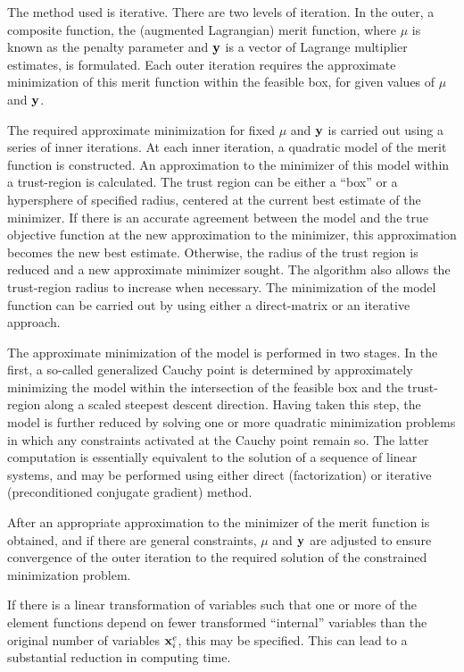 \documentclass{galahad}
\newcommand{\calG}{{\cal G}}
\begin{document}
The method used is iterative. There are two levels of iteration. In
the outer, a composite function, the (augmented Lagrangian) merit function,
\eqn{objectiveb}{\phi( \bmx, \bmy, \mu ) = f(\bmx) + \sum_{i \in \calG_C}
 y_i c_i (\bmx) + \frac{1}{2 \mu} \sum_{i \in \calG_C} (c_i (\bmx))^2,}
where $\mu$ is known as the penalty parameter and ${\mathbf{y}}$ is a vector of
Lagrange multiplier estimates,
is formulated. Each outer iteration requires the approximate
minimization of this merit function
within the feasible box, for given values of $\mu$ and ${\mathbf{y}}$.

The required approximate minimization for fixed  $\mu$ and ${\mathbf{y}}$ is
carried out using a series of inner iterations.  At each inner
iteration, a quadratic model of the merit function is
constructed.  An approximation to the minimizer of this model within a
trust-region is calculated.  The trust region can be either a ``box'' or
a hypersphere of specified radius, centered at the current best estimate
of the minimizer.  If there is an accurate agreement between the model
and the true objective function at the new approximation to the
minimizer, this approximation becomes the new best estimate.  Otherwise,
the radius of the trust region is reduced and a new approximate
minimizer sought.  The algorithm also allows the trust-region radius to
increase when necessary. The minimization of the model function can be
carried out by using either a direct-matrix or an iterative approach.

The approximate minimization of the model is performed in two stages.
In the first, a so-called generalized Cauchy point is determined
by approximately minimizing the model within the intersection of
the feasible box and the trust-region along a scaled steepest descent
direction. Having taken this step, the model is further reduced
by solving one or more quadratic minimization problems in which
any constraints activated at the Cauchy point remain so. The latter
computation is essentially equivalent to the solution of a sequence
of linear systems, and may be performed using either direct (factorization)
or iterative (preconditioned conjugate gradient) method.

After an appropriate approximation to the minimizer of the merit
function is obtained, and if there are general constraints,
$\mu$ and ${\mathbf{y}}$ are adjusted to ensure
convergence of the outer iteration to the required solution of the
constrained minimization problem.

If there is a linear transformation of variables such that one or more
of the element functions depend on fewer transformed ``internal''
variables than the original number of variables ${\mathbf{x}}^e_i$, this may be
specified. This can lead to a substantial reduction in computing time.
\end{document}
